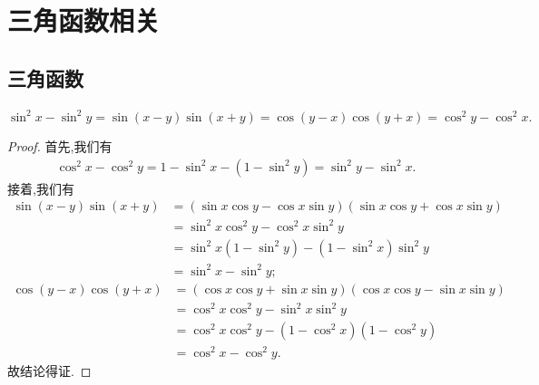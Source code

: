 \documentclass[../../main.tex]{subfiles}%
\begin{document}
\section{三角函数相关}

\subsection{三角函数}

\begin{theorem}[三角平方差公式]\label{theorem:三角平方差}
$\sin^2 x-\sin^2 y=\sin(x-y)\sin(x+y)=\cos(y-x)\cos(y+x)=\cos^2 y-\cos^2 x.$
\end{theorem}
\begin{proof}

首先,我们有
\begin{align*}
\cos ^2x-\cos ^2y=1-\sin ^2x-\left( 1-\sin ^2y \right) =\sin ^2y-\sin ^2x.
\end{align*}
接着,我们有
\begin{align*}
\sin(x-y)\sin(x+y) &= (\sin x \cos y - \cos x \sin y)(\sin x \cos y + \cos x \sin y) \\
&= \sin^2 x \cos^2 y - \cos^2 x \sin^2 y \\
&= \sin^2 x (1 - \sin^2 y) - (1 - \sin^2 x) \sin^2 y \\
&= \sin^2 x - \sin^2 y;
\end{align*}
\begin{align*}
\cos(y-x)\cos(y+x) &= (\cos x \cos y + \sin x \sin y)(\cos x \cos y - \sin x \sin y) \\
&= \cos^2 x \cos^2 y - \sin^2 x \sin^2 y \\
&= \cos^2 x \cos^2 y - (1 - \cos^2 x)(1 - \cos^2 y) \\
&= \cos^2 x - \cos^2 y.
\end{align*}
故结论得证.

\end{proof}
\end{document}
